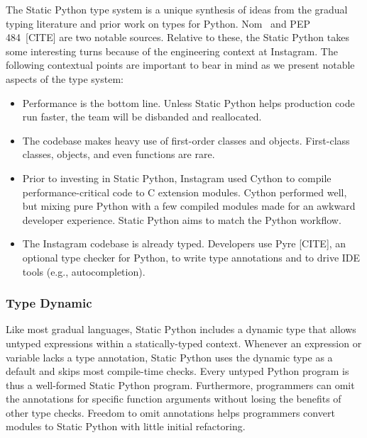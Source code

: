 \documentclass[english,cleveref,submission]{programming}
\newcommand{\SP}{Static Python}
\begin{document}
The \SP{} type system is a unique synthesis of ideas from the gradual typing literature
and prior work on types for Python.
Nom~\cite{mt-oopsla-2017,mt-oopsla-2021} and PEP 484~[CITE] are two notable sources.
Relative to these, the \SP{} takes some interesting turns
because of the engineering context at Instagram.
The following contextual points are important to bear in mind as we present
notable aspects of the type system:
\begin{itemize}
  \item
    Performance is the bottom line.
    Unless \SP{} helps production code run faster, the team will be disbanded
    and reallocated.
  \item
    The codebase makes heavy use of first-order classes and objects.
    First-class classes, objects, and even functions are rare.
  \item
    Prior to investing in \SP{}, Instagram used Cython to compile
    performance-critical code to C extension modules.
    Cython performed well, but mixing pure Python with a few compiled modules
    made for an awkward developer experience.
    \SP{} aims to match the Python workflow.
  \item
    The Instagram codebase is already typed.
    Developers use Pyre [CITE], an optional type checker for Python,
    to write type annotations and to drive IDE tools (e.g., autocompletion).
\end{itemize}



\subsubsection{Type Dynamic}
\label{s:type-dynamic}


Like most gradual languages, \SP{} includes a dynamic type
that allows untyped expressions within a statically-typed context.
Whenever an expression or variable lacks a type annotation,
\SP{} uses the dynamic type as a default and skips most compile-time checks.
Every untyped Python program is thus a well-formed \SP{} program.
Furthermore, programmers can omit the annotations for specific
function arguments without losing the benefits of other type checks.
Freedom to omit annotations helps programmers convert modules to \SP{}
with little initial refactoring.
\end{document}
